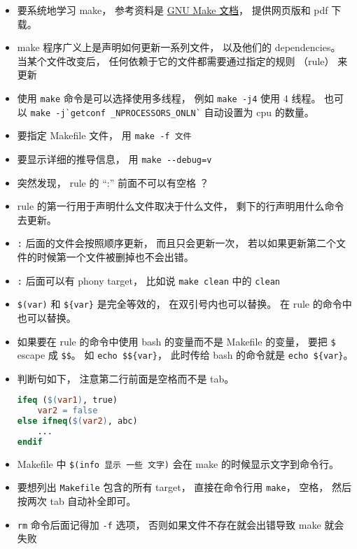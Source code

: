 


\begin{itemize}
\item 要系统地学习 make， 参考资料是 \href{https://www.gnu.org/software/make/manual/}{GNU Make 文档}， 提供网页版和 pdf 下载。
\item make 程序广义上是声明如何更新一系列文件， 以及他们的 dependencies。 当某个文件改变后， 任何依赖于它的文件都需要通过指定的规则 （rule） 来更新
\item 使用 \verb|make| 命令是可以选择使用多线程， 例如 \verb|make -j4| 使用 4 线程。 也可以 \verb|make -j`getconf _NPROCESSORS_ONLN`| 自动设置为 cpu 的数量。
\item 要指定 Makefile 文件， 用 \verb|make -f 文件|
\item 要显示详细的推导信息， 用 \verb|make --debug=v|
\item 突然发现， rule 的 “:” 前面不可以有空格 ？
\item rule 的第一行用于声明什么文件取决于什么文件， 剩下的行声明用什么命令去更新。
\item \verb|:| 后面的文件会按照顺序更新， 而且只会更新一次， 若以如果更新第二个文件的时候第一个文件被删掉也不会出错。
\item \verb|:| 后面可以有 phony target， 比如说 \verb|make clean| 中的 \verb|clean|
\item \verb|$(var)| 和 \verb|${var}| 是完全等效的， 在双引号内也可以替换。 在 rule 的命令中也可以替换。
\item 如果要在 rule 的命令中使用 bash 的变量而不是 Makefile 的变量， 要把 \verb|$| escape 成 \verb|$$|。 如 \verb|echo $${var}|， 此时传给 bash 的命令就是 \verb|echo ${var}|。
\item 判断句如下， 注意第二行前面是空格而不是 tab。
\begin{lstlisting}[language=makefile]
ifeq ($(var1), true)
    var2 = false
else ifneq($(var2), abc)
    ...
endif
\end{lstlisting}
\item Makefile 中 \verb|$(info 显示 一些 文字)| 会在 make 的时候显示文字到命令行。
\item 要想列出 \verb|Makefile| 包含的所有 target， 直接在命令行用 \verb|make|， 空格， 然后按两次 tab 自动补全即可。
\item \verb|rm| 命令后面记得加 \verb|-f| 选项， 否则如果文件不存在就会出错导致 make 就会失败

\end{itemize}
